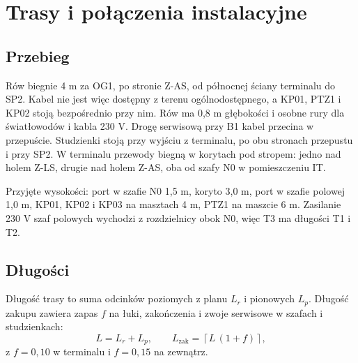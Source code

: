 \section{Trasy i połączenia instalacyjne}


\subsection*{Przebieg}
Rów biegnie 4 m za OG1, po stronie Z-AS, od północnej ściany terminalu do SP2. Kabel nie jest więc dostępny z terenu ogólnodostępnego, a KP01, PTZ1 i KP02 stoją bezpośrednio przy nim. Rów ma 0,8 m głębokości i osobne rury dla światłowodów i kabla 230 V. Drogę serwisową przy B1 kabel przecina w przepuście. Studzienki stoją przy wyjściu z terminalu, po obu stronach przepustu i przy SP2. W terminalu przewody biegną w korytach pod stropem: jedno nad holem Z-LS, drugie nad holem Z-AS, oba od szafy N0 w pomieszczeniu IT.

Przyjęte wysokości: port w szafie N0 1,5 m, koryto 3,0 m, port w szafie polowej 1,0 m, KP01, KP02 i KP03 na masztach 4 m, PTZ1 na maszcie 6 m. Zasilanie 230 V szaf polowych wychodzi z rozdzielnicy obok N0, więc T3 ma długości T1 i T2.\cite{OWN}

\subsection*{Długości}
Długość trasy to suma odcinków poziomych z planu $L_r$ i pionowych $L_p$. Długość zakupu zawiera zapas $f$ na łuki, zakończenia i zwoje serwisowe w szafach i studzienkach:
\[
L = L_r + L_p,\qquad L_{\mathrm{zak}} = \left\lceil L\,(1+f) \right\rceil,
\]
z $f=0{,}10$ w terminalu i $f=0{,}15$ na zewnątrz.


